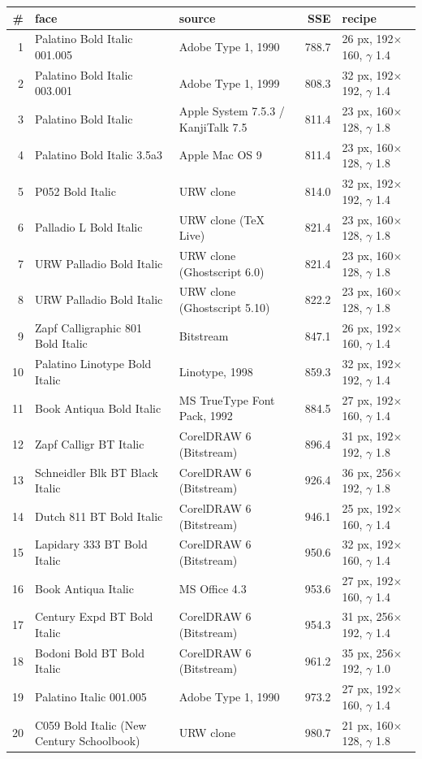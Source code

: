 \begin{tabular}{rllrl}\toprule
\# & face & source & SSE & recipe \\ \midrule
1 & Palatino Bold Italic 001.005 & Adobe Type 1, 1990 & 788.7 & 26 px, 192$\times$160, $\gamma$ 1.4 \\
2 & Palatino Bold Italic 003.001 & Adobe Type 1, 1999 & 808.3 & 32 px, 192$\times$192, $\gamma$ 1.4 \\
3 & Palatino Bold Italic & Apple System 7.5.3 / KanjiTalk 7.5 & 811.4 & 23 px, 160$\times$128, $\gamma$ 1.8 \\
4 & Palatino Bold Italic 3.5a3 & Apple Mac OS 9 & 811.4 & 23 px, 160$\times$128, $\gamma$ 1.8 \\
5 & P052 Bold Italic & URW clone & 814.0 & 32 px, 192$\times$192, $\gamma$ 1.4 \\
6 & Palladio L Bold Italic & URW clone (TeX Live) & 821.4 & 23 px, 160$\times$128, $\gamma$ 1.8 \\
7 & URW Palladio Bold Italic & URW clone (Ghostscript 6.0) & 821.4 & 23 px, 160$\times$128, $\gamma$ 1.8 \\
8 & URW Palladio Bold Italic & URW clone (Ghostscript 5.10) & 822.2 & 23 px, 160$\times$128, $\gamma$ 1.8 \\
9 & Zapf Calligraphic 801 Bold Italic & Bitstream & 847.1 & 26 px, 192$\times$160, $\gamma$ 1.4 \\
10 & Palatino Linotype Bold Italic & Linotype, 1998 & 859.3 & 32 px, 192$\times$192, $\gamma$ 1.4 \\
11 & Book Antiqua Bold Italic & MS TrueType Font Pack, 1992 & 884.5 & 27 px, 192$\times$160, $\gamma$ 1.4 \\
12 & Zapf Calligr BT Italic & CorelDRAW 6 (Bitstream) & 896.4 & 31 px, 192$\times$192, $\gamma$ 1.8 \\
13 & Schneidler Blk BT Black Italic & CorelDRAW 6 (Bitstream) & 926.4 & 36 px, 256$\times$192, $\gamma$ 1.8 \\
14 & Dutch 811 BT Bold Italic & CorelDRAW 6 (Bitstream) & 946.1 & 25 px, 192$\times$160, $\gamma$ 1.4 \\
15 & Lapidary 333 BT Bold Italic & CorelDRAW 6 (Bitstream) & 950.6 & 32 px, 192$\times$160, $\gamma$ 1.4 \\
16 & Book Antiqua Italic & MS Office 4.3 & 953.6 & 27 px, 192$\times$160, $\gamma$ 1.4 \\
17 & Century Expd BT Bold Italic & CorelDRAW 6 (Bitstream) & 954.3 & 31 px, 256$\times$192, $\gamma$ 1.4 \\
18 & Bodoni Bold BT Bold Italic & CorelDRAW 6 (Bitstream) & 961.2 & 35 px, 256$\times$192, $\gamma$ 1.0 \\
19 & Palatino Italic 001.005 & Adobe Type 1, 1990 & 973.2 & 27 px, 192$\times$160, $\gamma$ 1.4 \\
20 & C059 Bold Italic (New Century Schoolbook) & URW clone & 980.7 & 21 px, 160$\times$128, $\gamma$ 1.8 \\
\bottomrule\end{tabular}
